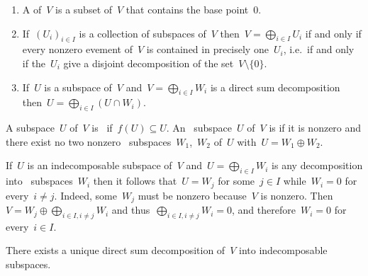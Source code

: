 \documentclass[a4paper,11pt]{scrartcl}
\begin{document}
\begin{recall}
  \begin{enumerate}
    \item
      A  of~$V$ is a subset of~$V$ that contains the base point~$0$.
    \item
      If~$(U_i)_{i \in I}$ is a collection of subspaces of~$V$ then~$V = \bigoplus_{i \in I} U_i$ if and only if every nonzero evement of~$V$ is contained in precisely one~$U_i$, i.e.\ if and only if the~$U_i$ give a disjoint decomposition of the set~$V \setminus \{ 0 \}$.
    \item
      If~$U$ is a subspace of~$V$ and~$V = \bigoplus_{i \in I} W_i$ is a direct sum decomposition then~$U = \bigoplus_{i \in I} (U \cap W_i)$.
  \end{enumerate}
\end{recall}

\begin{definition}
  A subspace~$U$ of~$V$ is~ if~$f(U) \subseteq U$.
  An~ subspace~$U$ of~$V$ is  if it is nonzero and there exist no two nonzero~ subspaces~$W_1$,~$W_2$ of~$U$ with~$U = W_1 \oplus W_2$.
\end{definition}

\begin{remark}
  If~$U$ is an indecomposable subspace of~$V$ and~$U = \bigoplus_{i \in I} W_i$ is any decomposition into~ subspaces~$W_i$ then it follows that~$U = W_j$ for some~$j \in I$ while~$W_i = 0$ for every~$i \neq j$.
  Indeed, some~$W_j$ must be nonzero because~$V$ is nonzero.
  Then~$V = W_j \oplus \bigoplus_{i \in I, i \neq j} W_i$ and thus~$\bigoplus_{i \in I, i \neq j} W_i = 0$, and therefore~$W_i = 0$ for every~$i \in I$.
\end{remark}

\begin{proposition}
  There exists a unique direct sum decomposition of~$V$ into indecomposable~ subspaces.
\end{proposition}
\end{document}
